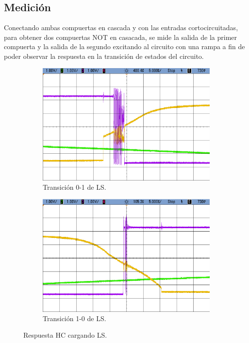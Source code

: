 \subsection{Medici\'on}
Conectando ambas compuertas en cascada y con las entradas cortocircuitadas, para obtener dos compuertas NOT en casacada, se mide la salida de la primer compuerta y la salida de la segundo excitando al circuito con una rampa a fin de poder observar la respuesta en la transici\'on de estados del circuito.
\begin{figure}[H]
\begin{subfigure}{.5\textwidth}
  \centering
  \includegraphics[width=.85\linewidth]{figs/EJ2/LS_HC_0_1.png}  
  \caption{Transici\'on 0-1 de LS.}
  \label{ej2_fig:LS_HC_01}
\end{subfigure}
\begin{subfigure}{.5\textwidth}
  \centering
  \includegraphics[width=.85\linewidth]{figs/EJ2/LS_HC_1_0.png}  
  \caption{Transici\'on 1-0 de LS.}
  \label{ej2_fig:LS_HC_01}
\end{subfigure}
\caption{Respuesta HC cargando LS.}
\label{ej2_fig:LS_HC}
\end{figure}

